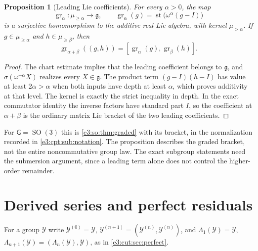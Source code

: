 \documentclass[11pt,letterpaper]{article}
\numberwithin{equation}{section}
\newtheorem{proposition}[proposition]{Proposition}
\theoremstyle{definition}
\theoremstyle{remark}
\newcommand{\st}{\operatorname{st}}
\newcommand{\SO}{\operatorname{SO}}
\newcommand{\comm}[2]{\left(#1,#2\right)}
\newcommand{\sG}{\mathsf G}
\begin{document}
\begin{proposition}[Leading Lie coefficients]\label{e3:cpt:prop:graded}
For every $\alpha>0$, the map
\[
 \operatorname{gr}_\alpha:\mu_{\ge\alpha}\longrightarrow\mathfrak g,
 \qquad
 \operatorname{gr}_\alpha(g)=\st\!\bigl(\omega^{\alpha}(g-I)\bigr)
\]
is a surjective homomorphism to the additive real Lie algebra, with kernel
$\mu_{>\alpha}$. If $g\in\mu_{\ge\alpha}$ and $h\in\mu_{\ge\beta}$, then
\[
 \operatorname{gr}_{\alpha+\beta}(\comm gh)
 =[\operatorname{gr}_\alpha(g),\operatorname{gr}_\beta(h)].
\]
\end{proposition}
\begin{proof}
The chart estimate implies that the leading coefficient belongs to
$\mathfrak g$, and $\sigma(\omega^{-\alpha}X)$ realizes every $X\in\mathfrak g$.
The product term $(g-I)(h-I)$ has value at least $2\alpha>\alpha$ when both
inputs have depth at least $\alpha$, which proves additivity at that level. The
kernel is exactly the strict inequality in depth. In the exact commutator
identity the inverse factors have standard part $I$, so the coefficient at
$\alpha+\beta$ is the ordinary matrix Lie bracket of the two leading
coefficients.
\end{proof}

For $\sG=\SO(3)$ this is \cref{e3:so:thm:graded} with its bracket, in the
normalization recorded in \cref{e3:cpt:sub:notation}. The proposition describes
the graded bracket, not the entire noncommutative group law. The exact subgroup
statements need the submersion argument, since a leading term alone does not
control the higher-order remainder.

\section{Derived series and perfect residuals}\label{e3:cpt:sec:residual}

For a group $\mathcal Y$ write $\mathcal Y^{(0)}=\mathcal Y$,
$\mathcal Y^{(n+1)}=\comm{\mathcal Y^{(n)}}{\mathcal Y^{(n)}}$, and
$\Lambda_1(\mathcal Y)=\mathcal Y$,
$\Lambda_{n+1}(\mathcal Y)=\comm{\Lambda_n(\mathcal Y)}{\mathcal Y}$, as in
\cref{e3:cut:sec:perfect}.
\end{document}
